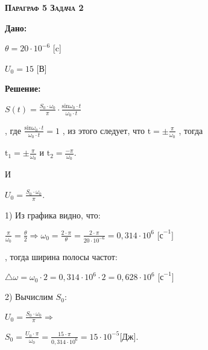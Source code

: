 \documentclass[a4paper, 17pt]{report}
\begin{document}
\textbf{ \textsc{Параграф 5 Задача 2}}

\textbf{Дано:}

$\theta = 20 \cdot 10^{-6} $ [c]

$U_0 = 15 $ [В]

\textbf{Решение:}

\centerline{
 $ S(t)=\frac{S_0 \cdot \omega_0}{\pi} \cdot \frac{\text{sin} \omega_0 \cdot t }{\omega_0 \cdot t} $
}
, где \Large $\frac{\text{sin} \omega_0 \cdot t }{\omega_0 \cdot t} = 1$ , из этого следует, что $\text{t} = \pm \frac{\pi}{\omega_0}$ , тогда

\centerline{  \Large $\text{t}_1 = \pm \frac{\pi}{\omega_0}$ и $\text{t}_2 = \frac{-\pi}{\omega_0}$.} 
И

\centerline{ \Large  $U_0 = \frac{S_0 \cdot \omega_0}{\pi}$.}

1) Из графика видно, что:

\centerline{
	\Large $\frac{\pi}{\omega_0}=\frac{\theta}{2} \Rightarrow \omega_0 = \frac{2\cdot\pi}{\theta} = \frac{2\cdot\pi}{20 \cdot 10^{-6}} = 0,314 \cdot 10^6 \text{ [с}^{-1}\text{]}$
}
, тогда ширина полосы частот:

\centerline{
	\Large $\triangle\omega = \omega_0 \cdot 2 = 0,314 \cdot 10^6 \cdot 2 = 0,628 \cdot 10^6 \text{ [с}^{-1}\text{]}$
}

2) Вычислим $S_0$:

\centerline{
	\Large $U_0 = \frac{S_0 \cdot \omega_0}{\pi} \Rightarrow$
}
	
\centerline{
	\Large $S_0 = \frac{U_0 \cdot \pi}{\omega_0} = \frac{15 \cdot \pi}{0,314 \cdot 10^6} = 15 \cdot 10^{-5} \text{[Дж].}$
}
\end{document}
